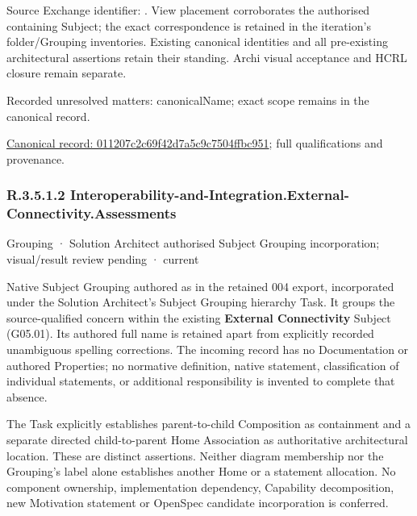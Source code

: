 Source Exchange identifier: \texttt{}. View placement corroborates
the authorised containing Subject; the exact correspondence is retained in the
iteration's folder/Grouping inventories. Existing canonical identities and all
pre-existing architectural assertions retain their standing. Archi visual
acceptance and HCRL closure remain separate.


{\small Recorded unresolved matters: canonicalName; exact scope remains in the canonical record.}\par
{\footnotesize \href{../../../../continuum/grouping/011207c2c69f42d7a5c9c7504ffbc951.md}{Canonical record: 011207c2c69f42d7a5c9c7504ffbc951}; full qualifications and provenance.}\par
\subsubsection*{R.3.5.1.2 Interoperability-and-Integration.External-Connectivity.Assessments}
\label{navigation:R.3.5.1.2}

\label{element:4cc994e1de714cc8915dc965d2694808}
{\small Grouping · Solution Architect authorised Subject Grouping incorporation; visual/result review pending · current}\par

Native Subject Grouping authored as \texttt{} in the retained 004 export,
incorporated under the Solution Architect's Subject Grouping hierarchy Task.
It groups the source-qualified \texttt{} concern within
the existing \textbf{External Connectivity} Subject (G05.01). Its authored full name
is retained apart from explicitly recorded unambiguous spelling corrections.
The incoming record has no Documentation or authored Properties; no normative
definition, native statement, classification of individual statements, or
additional responsibility is invented to complete that absence.



The Task explicitly establishes parent-to-child Composition as containment and
a separate directed child-to-parent Home Association as authoritative architectural
location. These are distinct assertions. Neither diagram membership nor the
Grouping's label alone establishes another Home or a statement allocation.
No component ownership, implementation dependency, Capability decomposition,
new Motivation statement or OpenSpec candidate incorporation is conferred.



